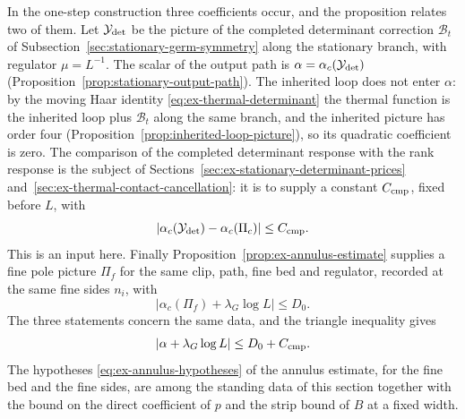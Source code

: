 In the one-step construction three coefficients occur, and the
proposition relates two of them. Let $\mathcal Y_{\rm det}$ be the
picture of the completed determinant correction
$\mathcal B_t$ of Subsection~\ref{sec:stationary-germ-symmetry} along the
stationary branch, with regulator $\mu=L^{-1}$. The scalar of the
output path is $\alpha=\alpha_c(\mathcal Y_{\rm det})$
(Proposition~\ref{prop:stationary-output-path}). The inherited loop
does not enter $\alpha$: by the moving Haar identity
\eqref{eq:ex-thermal-determinant} the thermal function is the
inherited loop plus $\mathcal B_t$ along the same branch, and the
inherited picture has order four
(Proposition~\ref{prop:inherited-loop-picture}), so its quadratic
coefficient is zero. The comparison of the completed determinant
response with the rank response is the subject of
Sections~\ref{sec:ex-stationary-determinant-prices}
and~\ref{sec:ex-thermal-contact-cancellation}: it is to supply a
constant $C_{\rm cmp}$, fixed before $L$, with
\[
 |\alpha_c(\mathcal Y_{\rm det})-\alpha_c(\Pi_c)|\leq C_{\rm cmp}.
\]
This is an input here. Finally
Proposition~\ref{prop:ex-annulus-estimate} supplies a fine pole picture
$\Pi_f$ for the same clip, path, fine bed and regulator, recorded at
the same fine sides $n_i$, with
\[
       |\alpha_c(\Pi_f)+\lambda_G\log L|\leq D_0 .
\]
The three statements concern the same data, and the triangle
inequality gives
\[
       |\alpha+\lambda_G\log L|
       \leq D_0+C_{\rm cmp}.
\]
The hypotheses \eqref{eq:ex-annulus-hypotheses} of the annulus
estimate, for the fine bed and the fine sides, are among the standing
data of this section together with the bound on the direct coefficient
of $p$ and the strip bound of $B$ at a fixed width.
